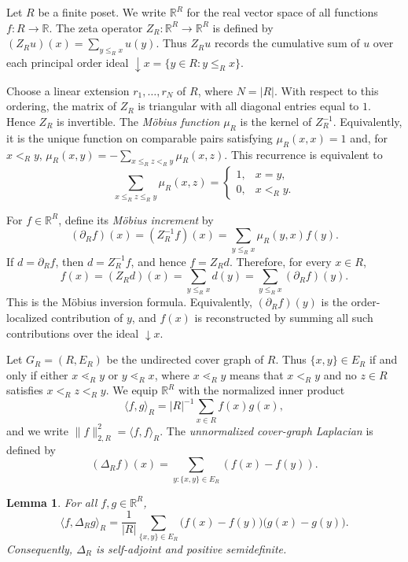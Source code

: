 \documentclass[twoside,12pt]{article}
\newtheorem{lemma}{Lemma}[section]
\begin{document}
Let \(R\) be a finite poset. We write \(\mathbb R^R\) for the real
vector space of all functions \(f:R\to\mathbb R\). The zeta operator
\(Z_R:\mathbb R^R\to\mathbb R^R\) is defined by
\((Z_Ru)(x)=\sum_{y\le_R x}u(y)\). Thus \(Z_Ru\) records the cumulative
sum of \(u\) over each principal order ideal \(\downarrow x=\{y\in R:y\le_R x\}\).

Choose a linear extension \(r_1,\ldots,r_N\) of \(R\), where \(N=|R|\).
With respect to this ordering, the matrix of \(Z_R\) is triangular with
all diagonal entries equal to \(1\). Hence \(Z_R\) is invertible. The
\textit{M\"obius function} \(\mu_R\) is the kernel of \(Z_R^{-1}\). Equivalently,
it is the unique function on comparable pairs satisfying
\(\mu_R(x,x)=1\) and, for \(x<_R y\),
\(\mu_R(x,y)=-\sum_{x\le_R z<_R y}\mu_R(x,z)\). This recurrence is
equivalent to
\begin{equation*}
 \sum_{x\le_R z\le_R y}\mu_R(x,z)
 =
 \begin{cases}
  1,& x=y,\\
  0,& x<_R y.
 \end{cases}
\end{equation*}

For \(f\in\mathbb R^R\), define its \textit{M\"obius increment} by
$$(\partial_R f)(x)=(Z_R^{-1}f)(x)=\sum_{y\le_R x}\mu_R(y,x)f(y).$$
If \(d=\partial_Rf\), then \(d=Z_R^{-1}f\), and hence \(f=Z_Rd\). Therefore,
for every \(x\in R\),
\begin{equation}\label{eq:mobius-reconstruction}
 f(x)=(Z_Rd)(x)=\sum_{y\le_R x}d(y)
      =\sum_{y\le_R x}(\partial_Rf)(y).
\end{equation}
This is the M\"obius inversion formula. Equivalently, \((\partial_Rf)(y)\)
is the order-localized contribution of \(y\), and \(f(x)\) is reconstructed
by summing all such contributions over the ideal \(\downarrow x\).

Let \(G_R=(R,E_R)\) be the undirected cover graph of \(R\). Thus
\(\{x,y\}\in E_R\) if and only if either \(x\lessdot_R y\) or
\(y\lessdot_R x\), where \(x\lessdot_R y\) means that \(x<_R y\) and no
\(z\in R\) satisfies \(x<_R z<_R y\). We equip \(\mathbb R^R\) with the
normalized inner product $$\langle f,g\rangle_R=|R|^{-1}\sum_{x\in R}f(x)g(x),$$
and we write \(\|f\|_{2,R}^2=\langle f,f\rangle_R\). The \emph{unnormalized
cover-graph Laplacian} is defined by
$$(\Delta_Rf)(x)=\sum_{y:\{x,y\}\in E_R}(f(x)-f(y)).$$

\begin{lemma}\label{lem:green-identity}
For all \(f,g\in\mathbb R^R\),
\begin{equation}\label{eq:green-identity}
 \langle f,\Delta_R g\rangle_R
 =
 \frac1{|R|}
 \sum_{\{x,y\}\in E_R}
 \bigl(f(x)-f(y)\bigr)\bigl(g(x)-g(y)\bigr).
\end{equation}
Consequently, \(\Delta_R\) is self-adjoint and positive semidefinite.
\end{lemma}
\end{document}
